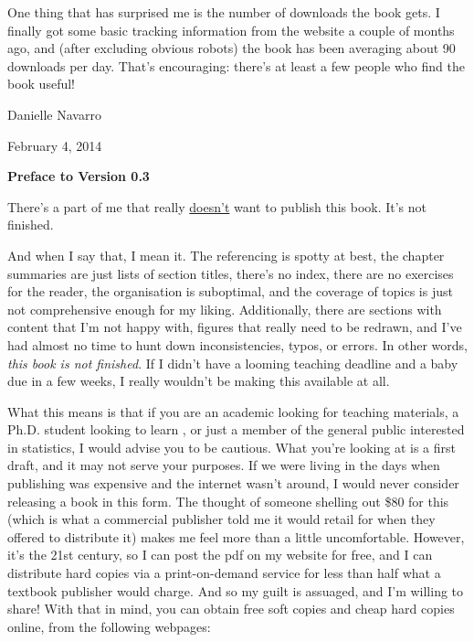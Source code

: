 One thing that has surprised me is the number of downloads the book gets. I finally got some basic tracking information from the website a couple of months ago, and (after excluding obvious robots) the book has been averaging about 90 downloads per day. That's encouraging: there's at least a few people who find the book useful!


\vspace*{24pt}
\noindent
Danielle Navarro 

\noindent
February 4, 2014


\vspace*{30pt}



\begin{center}{\Large {\bf Preface to Version 0.3}}\end{center}
\vspace*{12pt}


\noindent
There's a part of me that really \underline{doesn't} want to publish this book. It's not finished. \vsp

And when I say that, I mean it. The referencing is spotty at best, the chapter summaries are just lists of section titles, there's no index, there are no exercises for the reader, the organisation is suboptimal, and the coverage of topics is just not comprehensive enough for my liking. Additionally, there are sections with content that I'm not happy with, figures that really need to be redrawn, and I've had almost no time to hunt down inconsistencies, typos, or errors. In other words, {\it this book is not finished}. If I didn't have a looming teaching deadline and a baby due in a few weeks, I really wouldn't be making this available at all. \vsp

What this means is that if you are an academic looking for teaching materials, a Ph.D. student looking to learn \R, or just a member of the general public interested in statistics, I would advise you to be cautious. What you're looking at is a first draft, and it may not serve your purposes. If we were living in the days when publishing was expensive and the internet wasn't around, I would never consider releasing a book in this form. The thought of someone shelling out \$80 for this (which is what a commercial publisher told me it would retail for when they offered to distribute it) makes me feel more than a little uncomfortable. However, it's the 21st century, so I can post the pdf on my website for free, and I can distribute hard copies via a print-on-demand service for less than half what a textbook publisher would charge. And so my guilt is assuaged, and I'm willing to share! With that in mind, you can obtain free soft copies and cheap hard copies online, from the following webpages:\vsp

